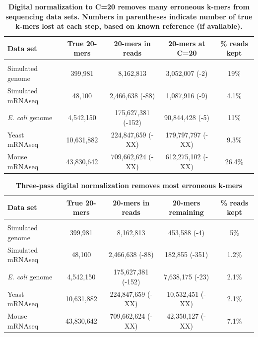 \documentclass[10pt]{article}
\begin{document}
\begin{table}[!ht]
\caption{
\bf{Digital normalization to C=20 removes many erroneous k-mers from sequencing data sets.  Numbers
in parentheses indicate number of true k-mers lost at each step, based on known reference (if available).}}
\begin{tabular}{|l|c|c|c|c|}
Data set & True 20-mers & 20-mers in reads & 20-mers at C=20 & \% reads kept\\
\hline \\
Simulated genome & 399,981 & 8,162,813 & 3,052,007 (-2) & 19\% \\
Simulated mRNAseq & 48,100 & 2,466,638 (-88) & 1,087,916 (-9) & 4.1\% \\
{\em E. coli} genome & 4,542,150 & 175,627,381 (-152) & 90,844,428 (-5) & 11\% \\
Yeast mRNAseq & 10,631,882 & 224,847,659 (-XX) & 179,797,797 (-XX) & 9.3\% \\
Mouse mRNAseq & 43,830,642 & 709,662,624 (-XX) & 612,275,102 (-XX) & 26.4\% \\
\end{tabular}
\begin{flushleft}
\end{flushleft}
\label{tab:normC20}
\end{table}



\begin{table}[!ht]
\caption{
\bf{Three-pass digital normalization removes most erroneous k-mers}}
\begin{tabular}{|l|c|c|c|c|}
Data set & True 20-mers & 20-mers in reads & 20-mers remaining & \% reads kept\\
\hline \\
Simulated genome & 399,981 & 8,162,813 & 453,588 (-4) & 5\% \\
Simulated mRNAseq & 48,100 & 2,466,638 (-88) & 182,855 (-351) & 1.2\% \\
{\em E. coli} genome & 4,542,150 & 175,627,381 (-152) & 7,638,175 (-23) & 2.1\% \\
Yeast mRNAseq & 10,631,882 & 224,847,659 (-XX) & 10,532,451 (-XX) & 2.1\% \\
Mouse mRNAseq & 43,830,642 & 709,662,624 (-XX) & 42,350,127 (-XX) & 7.1\% \\
\end{tabular}
\begin{flushleft}
\end{flushleft}
\label{tab:normC5}
\end{table}
\end{document}
